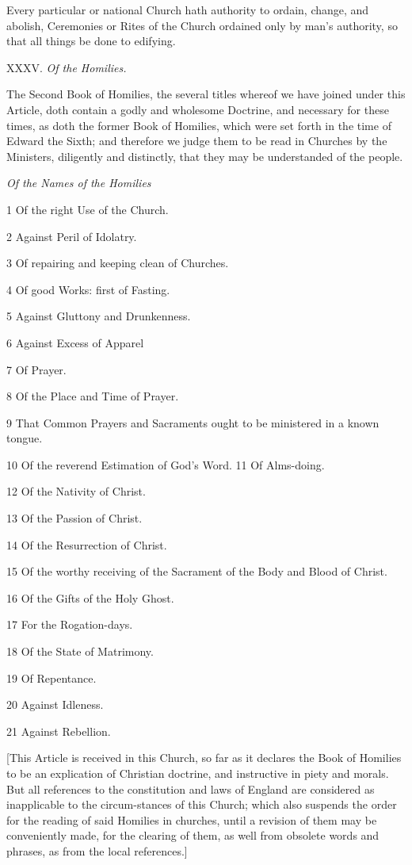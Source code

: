 Every particular or national Church hath authority
to ordain, change, and abolish, Ceremonies or Rites of the Church ordained
only by man’s authority, so that all things be done to edifying.

XXXV. \emph{Of the Homilies.}

The Second Book of Homilies, the several titles whereof
we have joined under this Article, doth contain a godly and wholesome
Doctrine, and necessary for these times, as doth the former Book of Homilies,
which were set forth in the time of Edward the Sixth; and therefore we
judge them to be read in Churches by the Ministers, diligently and distinctly,
that they may be understanded of the people.

\emph{Of the Names of the Homilies}

1
Of the right Use of the Church. 

2 Against Peril of Idolatry.

3 Of repairing and keeping clean of Churches.

4 Of good Works: first of Fasting. 

5 Against Gluttony and Drunkenness.

6 Against Excess of Apparel

7 Of Prayer.

8 Of the Place and Time of Prayer.

9 That Common Prayers and Sacraments ought to be ministered in a known
tongue.

10 Of the reverend Estimation of God’s Word. 11
Of Alms-doing.

12 Of the Nativity of Christ.

13 Of the Passion of Christ.

14 Of the Resurrection of Christ.

15 Of the worthy receiving of the Sacrament of the Body and Blood
of Christ.

16 Of the Gifts of the Holy Ghost.

17 For the Rogation-days.

18 Of the State of Matrimony.

19 Of Repentance.

20 Against Idleness.

21 Against Rebellion.

[This Article is received in this Church,
so far as it declares the Book of Homilies to be an explication of Christian
doctrine, and instructive in piety and morals. But all references to the
constitution and laws of England are considered as inapplicable to the
circum-stances of this Church; which also suspends the order for the reading
of said Homilies in churches, until a revision of them may be conveniently
made, for the clearing of them, as well from obsolete words and phrases,
as from the local references.]

